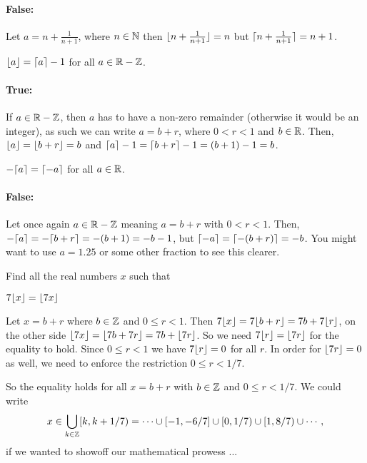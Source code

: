 \documentclass[a4paper, english, 12pt]{article} %
\begin{document}
\begin{answer}
  \paragraph{False:} Let $a = n + \frac{1}{n+1}$, where $n \in \mathbb{N}$ then
  $\lfloor n + \frac{1}{n+1}\rfloor = n$ but $\lceil n + \frac{1}{n+1}\rceil = n+1$.
\end{answer}

\begin{subproblem}
  $\lfloor a\rfloor = \lceil a\rceil - 1$ for all $a \in \mathbb{R} - \mathbb{Z}$.
\end{subproblem}

\begin{answer}
  \paragraph{True: } If $a \in \mathbb{R} - \mathbb{Z}$, then $a$ has to have a non-zero
  remainder (otherwise it would be an integer), as such we can write $a = b +
  r$, where $0 < r < 1$ and $b \in \mathbb{R}$. Then, $\lfloor a\rfloor = \lfloor b+r\rfloor=b$ and
  $\lceil a\rceil-1 = \lceil b+r\rceil-1 = (b+1)-1 = b$. 
\end{answer}

\begin{subproblem}
  $-\lceil a\rceil = \lceil-a\rceil$ for all $a \in \mathbb{R}$.
\end{subproblem}

\begin{answer}
  \paragraph{False: } Let once again $a \in \mathbb{R} - \mathbb{Z}$ meaning $a = b + r$ with $0
  < r < 1$. Then, $-\lceil a\rceil = -\lceil b+r\rceil = -(b+1)=-b-1$, but
  $\lceil-a\rceil=\lceil-(b+r)\rceil=-b$. You might want to use $a = 1.25$ or some other
  fraction to see this clearer.
\end{answer}

\begin{problem}
  Find all the real numbers $x$ such that
\end{problem}

\begin{subproblem}
  $7 \lfloor x\rfloor = \lfloor7x\rfloor$
\end{subproblem}

\begin{answer}
  Let $x = b + r$ where $b\in \mathbb{Z}$ and $0 \leq r < 1$. Then $7 \lfloor x\rfloor = 7
  \lfloor b + r\rfloor = 7b + 7 \lfloor r\rfloor$, on the other side $\lfloor7x\rfloor = \lfloor7b +
    7r\rfloor = 7b + \lfloor7r\rfloor$. So we need $7\lfloor r\rfloor = \lfloor7r\rfloor$ for the
  equality to hold. Since $0 \leq r < 1$ we have $7\lfloor r\rfloor = 0$ for all $r$.
  In order for $\lfloor7r\rfloor = 0$ as well, we need to enforce the restriction $0
  \leq r < 1/7$.

  So the equality holds for all $x = b + r$ with $b \in \mathbb{Z}$ and $0 \leq r <
  1/7$. We could write
  \begin{equation}
    x \in \bigcup_{k \in \mathbb{Z}} [k,k+1/7)
    = \cdots \cup [-1,-6/7] \cup [0,1/7) \cup [1,8/7) \cup \cdots\,,
  \end{equation}
  if we wanted to showoff our mathematical prowess ...
\end{answer}
\end{document}
